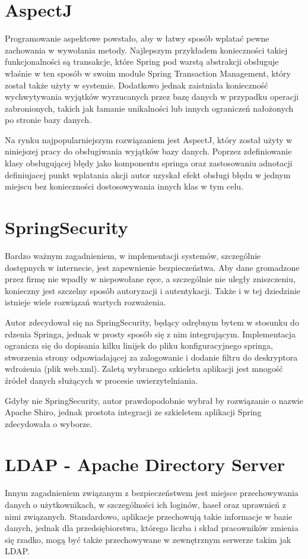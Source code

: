 \section{AspectJ}
Programowanie aspektowe powstało, aby w łatwy sposób wplatać pewne zachowania w wywołania metody. Najlepszym przykładem konieczności takiej funkcjonalności są transakcje, które Spring pod warstą abstrakcji obsługuje właśnie w ten sposób w swoim module Spring Transaction Management, który został także użyty w systemie. Dodatkowo jednak zaistniała konieczność wychwytywania wyjątków wyrzucanych przez bazę danych w przypadku operacji zabronionych, takich jak łamanie unikalności lub innych ograniczeń nałożonych po stronie bazy danych.

Na rynku najpopularniejszym rozwiązaniem jest AspectJ, który został użyty w niniejszej pracy do obsługiwania wyjątków bazy danych. Poprzez zdefiniowanie klasy obsługującej błędy jako komponentu springa oraz zastosowaniu adnotacji definiujacej punkt wplatania akcji autor uzyskał efekt obsługi błędu w jednym miejscu bez konieczności dostosowywania innych klas w tym celu.

\section{SpringSecurity}
Bardzo ważnym zagadnieniem, w implementacji systemów, szczególnie dostępnych w internecie, jest zapewnienie bezpieczeństwa. Aby dane gromadzone przez firmę nie wpadły w niepowołane ręce, a szczególnie nie uległy zniszczeniu, konieczny jest szczelny sposób autoryzacji i autentykacji. Także i w tej dziedzinie istnieje wiele rozwiązań wartych rozważenia.

Autor zdecydował się na SpringSecurity, będący odrębnym bytem w stosunku do rdzenia Springa, jednak w prosty sposób się z nim integrującym. Implementacja ogranicza się do dopisania kilku linijek do pliku konfiguracyjnego springa, stworzenia strony odpowiadającej za zalogowanie i dodanie filtru do deskryptora wdrożenia (plik web.xml). Zaletą wybranego szkieletu aplikacji jest mnogość źródeł danych służących w procesie uwierzytelniania.

Gdyby nie SpringSecurity, autor prawdopodobnie wybrał by rozwiązanie o nazwie Apache Shiro, jednak prostota integracji ze szkieletem aplikacji Spring zdecydowała o wyborze.
\newpage
\section{LDAP - Apache Directory Server}
Innym zagadnieniem związanym z bezpieczeństwem jest miejsce przechowywania danych o użytkownikach, w szczególności ich loginów, haseł oraz uprawnień z nimi związanych. Standardowo, aplikacje przechowują takie informacje w bazie danych, jednak dla przedsiębiorstwa, którego liczba i skład pracowników zmienia się rzadko, mogą być także przechowywane w zewnętrznym serwerze takim jak LDAP.

